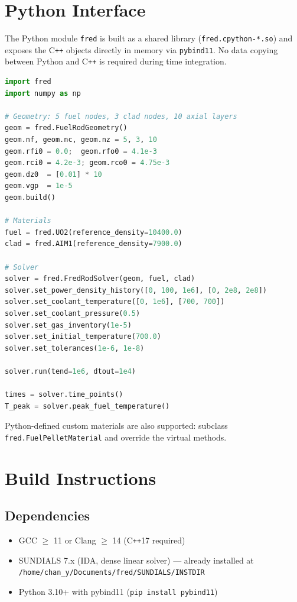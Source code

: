 \documentclass[11pt,a4paper]{article}
\begin{document}
\section{Python Interface}

The Python module \texttt{fred} is built as a shared library
(\texttt{fred.cpython-*.so}) and exposes the C\texttt{++} objects directly
in memory via \texttt{pybind11}.  No data copying between Python and C\texttt{++}
is required during time integration.

\begin{lstlisting}[language=Python]
import fred
import numpy as np

# Geometry: 5 fuel nodes, 3 clad nodes, 10 axial layers
geom = fred.FuelRodGeometry()
geom.nf, geom.nc, geom.nz = 5, 3, 10
geom.rfi0 = 0.0;  geom.rfo0 = 4.1e-3
geom.rci0 = 4.2e-3; geom.rco0 = 4.75e-3
geom.dz0  = [0.01] * 10
geom.vgp  = 1e-5
geom.build()

# Materials
fuel = fred.UO2(reference_density=10400.0)
clad = fred.AIM1(reference_density=7900.0)

# Solver
solver = fred.FredRodSolver(geom, fuel, clad)
solver.set_power_density_history([0, 100, 1e6], [0, 2e8, 2e8])
solver.set_coolant_temperature([0, 1e6], [700, 700])
solver.set_coolant_pressure(0.5)
solver.set_gas_inventory(1e-5)
solver.set_initial_temperature(700.0)
solver.set_tolerances(1e-6, 1e-8)

solver.run(tend=1e6, dtout=1e4)

times = solver.time_points()
T_peak = solver.peak_fuel_temperature()
\end{lstlisting}

Python-defined custom materials are also supported: subclass
\texttt{fred.FuelPelletMaterial} and override the virtual methods.

\section{Build Instructions}

\subsection{Dependencies}

\begin{itemize}
  \item GCC $\ge$ 11 or Clang $\ge$ 14 (C\texttt{++}17 required)
  \item SUNDIALS 7.x (IDA, dense linear solver) — already installed at
        \texttt{/home/chan\_y/Documents/fred/SUNDIALS/INSTDIR}
  \item Python 3.10+ with pybind11 (\texttt{pip install pybind11})
\end{itemize}
\end{document}
